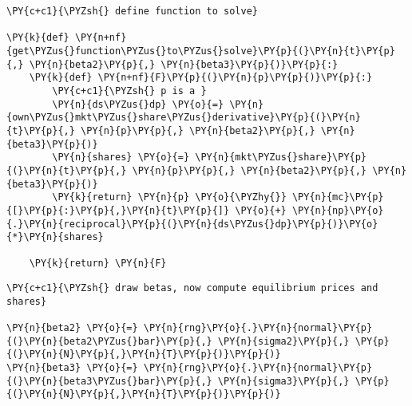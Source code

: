     \begin{tcolorbox}[breakable, size=fbox, boxrule=1pt, pad at break*=1mm,colback=cellbackground, colframe=cellborder]
\begin{Verbatim}[commandchars=\\\{\}]
\PY{c+c1}{\PYZsh{} define function to solve}

\PY{k}{def} \PY{n+nf}{get\PYZus{}function\PYZus{}to\PYZus{}solve}\PY{p}{(}\PY{n}{t}\PY{p}{,} \PY{n}{beta2}\PY{p}{,} \PY{n}{beta3}\PY{p}{)}\PY{p}{:}
    \PY{k}{def} \PY{n+nf}{F}\PY{p}{(}\PY{n}{p}\PY{p}{)}\PY{p}{:}
        \PY{c+c1}{\PYZsh{} p is a }
        \PY{n}{ds\PYZus{}dp} \PY{o}{=} \PY{n}{own\PYZus{}mkt\PYZus{}share\PYZus{}derivative}\PY{p}{(}\PY{n}{t}\PY{p}{,} \PY{n}{p}\PY{p}{,} \PY{n}{beta2}\PY{p}{,} \PY{n}{beta3}\PY{p}{)}
        \PY{n}{shares} \PY{o}{=} \PY{n}{mkt\PYZus{}share}\PY{p}{(}\PY{n}{t}\PY{p}{,} \PY{n}{p}\PY{p}{,} \PY{n}{beta2}\PY{p}{,} \PY{n}{beta3}\PY{p}{)}
        \PY{k}{return} \PY{n}{p} \PY{o}{\PYZhy{}} \PY{n}{mc}\PY{p}{[}\PY{p}{:}\PY{p}{,}\PY{n}{t}\PY{p}{]} \PY{o}{+} \PY{n}{np}\PY{o}{.}\PY{n}{reciprocal}\PY{p}{(}\PY{n}{ds\PYZus{}dp}\PY{p}{)}\PY{o}{*}\PY{n}{shares}

    \PY{k}{return} \PY{n}{F}
\end{Verbatim}
\end{tcolorbox}

    \begin{tcolorbox}[breakable, size=fbox, boxrule=1pt, pad at break*=1mm,colback=cellbackground, colframe=cellborder]
\begin{Verbatim}[commandchars=\\\{\}]
\PY{c+c1}{\PYZsh{} draw betas, now compute equilibrium prices and shares}

\PY{n}{beta2} \PY{o}{=} \PY{n}{rng}\PY{o}{.}\PY{n}{normal}\PY{p}{(}\PY{n}{beta2\PYZus{}bar}\PY{p}{,} \PY{n}{sigma2}\PY{p}{,} \PY{p}{(}\PY{n}{N}\PY{p}{,}\PY{n}{T}\PY{p}{)}\PY{p}{)}
\PY{n}{beta3} \PY{o}{=} \PY{n}{rng}\PY{o}{.}\PY{n}{normal}\PY{p}{(}\PY{n}{beta3\PYZus{}bar}\PY{p}{,} \PY{n}{sigma3}\PY{p}{,} \PY{p}{(}\PY{n}{N}\PY{p}{,}\PY{n}{T}\PY{p}{)}\PY{p}{)}
\end{Verbatim}
\end{tcolorbox}

